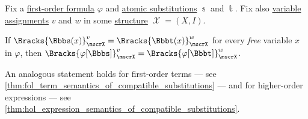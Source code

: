 \begin{proposition}\label{thm:fol_formula_semantics_of_compatible_substitutions}
  Fix a \hyperref[def:fol_formula]{first-order formula} \( \varphi \) and \hyperref[def:atomic_fol_substitution]{atomic substitutions} \( \Bbbs \) and \( \Bbbt \). Fix also \hyperref[def:fol_variable_assignment]{variable assignments} \( v \) and \( w \) in some \hyperref[def:fol_structure]{structure} \( \mscrX = (X, I) \).

  If \( \Bracks{\Bbbs(x)}_\mscrX^v = \Bracks{\Bbbt(x)}_\mscrX^w \) for every \emph{free} variable \( x \) in \( \varphi \), then \( \Bracks{\varphi[\Bbbs]}_\mscrX^v = \Bracks{\varphi[\Bbbt]}_\mscrX^w \).
\end{proposition}
\begin{comments}
  \item An analogous statement holds for first-order terms --- see \cref{thm:fol_term_semantics_of_compatible_substitutions} --- and for higher-order expressions --- see \cref{thm:hol_expression_semantics_of_compatible_substitutions}.
\end{comments}
